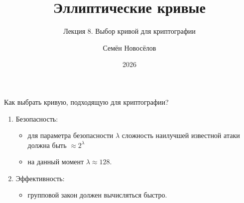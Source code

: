 \documentclass{beamer}
\title{Эллиптические кривые}
\subtitle{Лекция 8. Выбор кривой для криптографии}
\author{Семён Новосёлов}
\institute{БФУ им. И. Канта}
\date{2026}
\begin{document}
\frame{\titlepage}


\begin{frame}{Как выбрать кривую, подходящую для криптографии?}
\begin{enumerate}
    \item Безопасность: 
    
    \vspace{0.3em}
    
    \begin{itemize}
    	\item для параметра безопасности $\lambda$ сложность наилучшей известной атаки должна быть $\approx 2^\lambda$
    	\vspace{0.2em}
    	\item на данный момент $\lambda \approx 128$.
    \end{itemize}
    \vspace{0.2em}
    \item Эффективность: 
    \begin{itemize}
    	\item групповой закон должен вычисляться быстро.
    \end{itemize}
\end{enumerate}
\end{frame}
\end{document}
